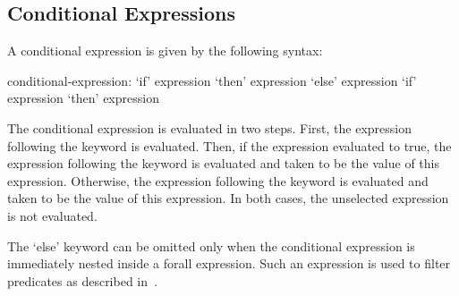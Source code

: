 \subsection{Conditional Expressions}
\label{Conditional_Expressions}

A conditional expression is given by the following syntax:
\begin{syntax}
conditional-expression:
  `if' expression `then' expression `else' expression
  `if' expression `then' expression
\end{syntax}
The conditional expression is evaluated in two steps.  First, the
expression following the  keyword is evaluated.  Then, if the
expression evaluated to true, the expression following the 
keyword is evaluated and taken to be the value of this expression.
Otherwise, the expression following the  keyword is
evaluated and taken to be the value of this expression.  In both
cases, the unselected expression is not evaluated.

The `else' keyword can be omitted only when the conditional expression
is immediately nested inside a forall expression.  Such an expression
is used to filter predicates as described
in~.
